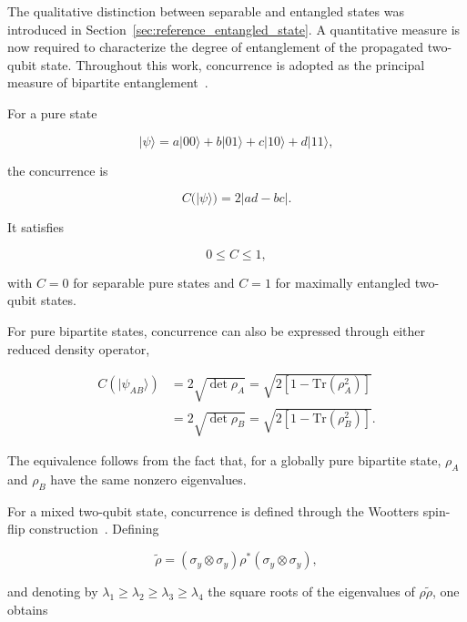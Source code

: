 The qualitative distinction between separable and entangled states was introduced
in Section~\ref{sec:reference_entangled_state}. A quantitative measure is now
required to characterize the degree of entanglement of the propagated two-qubit
state. Throughout this work, concurrence is adopted as the principal measure of
bipartite entanglement~\cite{wootters_entanglement_1998}.

For a pure state

\begin{equation}
|\psi\rangle
=
a|00\rangle
+b|01\rangle
+c|10\rangle
+d|11\rangle,
\label{eq:general_pure_two_qubit_state_concurrence}
\end{equation}

the concurrence is

\begin{equation}
C(|\psi\rangle)
=
2|ad-bc|.
\label{eq:pure_state_concurrence}
\end{equation}

It satisfies

\begin{equation}
0\leq C\leq1,
\end{equation}

with \(C=0\) for separable pure states and \(C=1\) for maximally entangled
two-qubit states.

For pure bipartite states, concurrence can also be expressed through either
reduced density operator,

\begin{align}
C(|\psi_{AB}\rangle)
&=
2\sqrt{\det\rho_A}
=
\sqrt{
2\left[
1-\mathrm{Tr}(\rho_A^2)
\right]
}
\nonumber
\\
&=
2\sqrt{\det\rho_B}
=
\sqrt{
2\left[
1-\mathrm{Tr}(\rho_B^2)
\right]
}.
\label{eq:concurrence_reduced_density_relation}
\end{align}

The equivalence follows from the fact that, for a globally pure bipartite state,
\(\rho_A\) and \(\rho_B\) have the same nonzero eigenvalues.

For a mixed two-qubit state, concurrence is defined through the Wootters
spin-flip construction~\cite{wootters_entanglement_1998}. Defining

\begin{equation}
\widetilde{\rho}
=
(\sigma_y\otimes\sigma_y)
\rho^*
(\sigma_y\otimes\sigma_y),
\label{eq:spin_flipped_density_matrix}
\end{equation}

and denoting by
\(\lambda_1\geq\lambda_2\geq\lambda_3\geq\lambda_4\)
the square roots of the eigenvalues of
\(\rho\widetilde{\rho}\), one obtains

